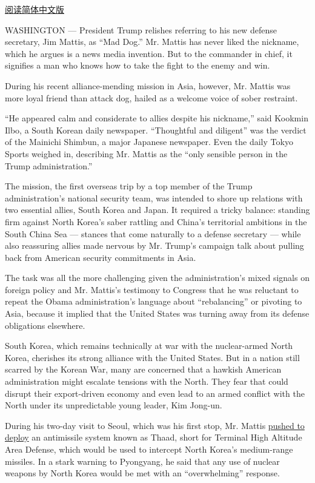\href{http://cn.nytimes3xbfgragh.onion/asia-pacific/20170206/jim-mattis-south-korea-japan/}{阅读简体中文版}

WASHINGTON --- President Trump relishes referring to his new defense
secretary, Jim Mattis, as ``Mad Dog.'' Mr. Mattis has never liked the
nickname, which he argues is a news media invention. But to the
commander in chief, it signifies a man who knows how to take the fight
to the enemy and win.

During his recent alliance-mending mission in Asia, however, Mr. Mattis
was more loyal friend than attack dog, hailed as a welcome voice of
sober restraint.

``He appeared calm and considerate to allies despite his nickname,''
said Kookmin Ilbo, a South Korean daily newspaper. ``Thoughtful and
diligent'' was the verdict of the Mainichi Shimbun, a major Japanese
newspaper. Even the daily Tokyo Sports weighed in, describing Mr. Mattis
as the ``only sensible person in the Trump administration.''

The mission, the first overseas trip by a top member of the Trump
administration's national security team, was intended to shore up
relations with two essential allies, South Korea and Japan. It required
a tricky balance: standing firm against North Korea's saber rattling and
China's territorial ambitions in the South China Sea --- stances that
come naturally to a defense secretary --- while also reassuring allies
made nervous by Mr. Trump's campaign talk about pulling back from
American security commitments in Asia.

The task was all the more challenging given the administration's mixed
signals on foreign policy and Mr. Mattis's testimony to Congress that he
was reluctant to repeat the Obama administration's language about
``rebalancing'' or pivoting to Asia, because it implied that the United
States was turning away from its defense obligations elsewhere.

South Korea, which remains technically at war with the nuclear-armed
North Korea, cherishes its strong alliance with the United States. But
in a nation still scarred by the Korean War, many are concerned that a
hawkish American administration might escalate tensions with the North.
They fear that could disrupt their export-driven economy and even lead
to an armed conflict with the North under its unpredictable young
leader, Kim Jong-un.

During his two-day visit to Seoul, which was his first stop, Mr. Mattis
\href{https://www.nytimes3xbfgragh.onion/2017/02/02/world/asia/james-mattis-us-korea-thaad.html}{pushed
to deploy} an antimissile system known as Thaad, short for Terminal High
Altitude Area Defense, which would be used to intercept North Korea's
medium-range missiles. In a stark warning to Pyongyang, he said that any
use of nuclear weapons by North Korea would be met with an
``overwhelming'' response.

